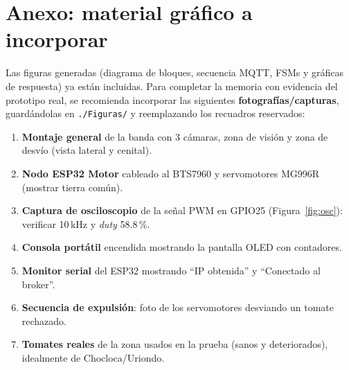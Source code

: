 \documentclass[12pt]{catolica_proyectos}
\begin{document}
\section{Anexo: material gráfico a incorporar}

Las figuras generadas (diagrama de bloques, secuencia MQTT, FSMs y gráficas de respuesta) ya están incluidas. Para completar la memoria con evidencia del prototipo real, se recomienda incorporar las siguientes \textbf{fotografías/capturas}, guardándolas en \texttt{./Figuras/} y reemplazando los recuadros reservados:

\begin{enumerate}
  \item \textbf{Montaje general} de la banda con 3 cámaras, zona de visión y zona de desvío (vista lateral y cenital).
  \item \textbf{Nodo ESP32 Motor} cableado al BTS7960 y servomotores MG996R (mostrar tierra común).
  \item \textbf{Captura de osciloscopio} de la señal PWM en GPIO25 (Figura~\ref{fig:osc}): verificar 10\,kHz y \emph{duty} 58.8\,\%.
  \item \textbf{Consola portátil} encendida mostrando la pantalla OLED con contadores.
  \item \textbf{Monitor serial} del ESP32 mostrando ``IP obtenida'' y ``Conectado al broker''.
  \item \textbf{Secuencia de expulsión}: foto de los servomotores desviando un tomate rechazado.
  \item \textbf{Tomates reales} de la zona usados en la prueba (sanos y deteriorados), idealmente de Chocloca/Uriondo.
\end{enumerate}

\newpage
\printbibliography[heading=bibintoc, title={Referencias Bibliográficas}]
\end{document}

